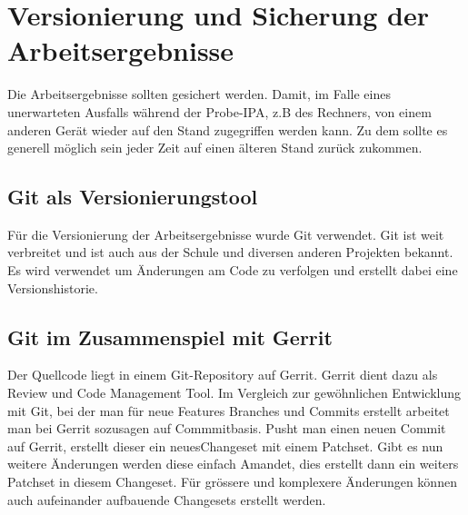 \chapter{Versionierung und Sicherung der Arbeitsergebnisse}\label{ch:versionierung-und-sicherung-der-arbeitsergebnisse}

Die Arbeitsergebnisse sollten gesichert werden. Damit, im Falle eines unerwarteten Ausfalls während der Probe-IPA, z.B des Rechners, von einem anderen Gerät wieder auf den Stand zugegriffen werden kann. Zu dem sollte es generell möglich sein jeder Zeit auf einen älteren Stand zurück zukommen.

\section{Git als Versionierungstool}
Für die Versionierung der Arbeitsergebnisse wurde Git verwendet. 
Git ist weit verbreitet und ist auch aus der Schule und diversen anderen Projekten bekannt. Es wird verwendet um Änderungen am Code zu verfolgen und erstellt dabei eine Versionshistorie. 

\section{Git im Zusammenspiel mit Gerrit}
Der Quellcode liegt in einem Git-Repository auf Gerrit. Gerrit dient dazu als Review und Code Management Tool. 
Im Vergleich zur \flqq gewöhnlichen\frqq{}  Entwicklung mit Git, bei der man für neue Features Branches und Commits erstellt arbeitet man bei Gerrit sozusagen auf Commmitbasis. 
Pusht man einen neuen Commit auf Gerrit, erstellt dieser ein neues\flqq Changeset\frqq{}  mit einem Patchset. Gibt es nun weitere Änderungen werden diese einfach Amandet, dies erstellt dann ein weiters Patchset in diesem Changeset. Für grössere und komplexere Änderungen können auch aufeinander aufbauende Changesets erstellt werden. 
